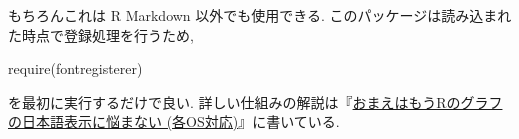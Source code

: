 \documentclass[
  xelatex,ja=standard,jafont=noto]{bxjsbook}
\newenvironment{Shaded}{\begin{snugshade}}{\end{snugshade}}
\newcommand{\FunctionTok}[1]{\textcolor[rgb]{0.00,0.00,0.00}{#1}}
\newcommand{\NormalTok}[1]{#1}
\theoremstyle{definition}
\theoremstyle{definition}
\theoremstyle{definition}
\theoremstyle{definition}
\theoremstyle{remark}
\begin{document}
もちろんこれは R Markdown 以外でも使用できる.
このパッケージは読み込まれた時点で登録処理を行うため,

\begin{Shaded}
\begin{Highlighting}[numbers=left,,]
\FunctionTok{require}\NormalTok{(fontregisterer)}
\end{Highlighting}
\end{Shaded}

を最初に実行するだけで良い.
詳しい仕組みの解説は『\href{https://ill-identified.hatenablog.com/entry/2020/10/03/200618}{おまえはもうRのグラフの日本語表示に悩まない
(各OS対応)}』に書いている.


  
\end{document}
